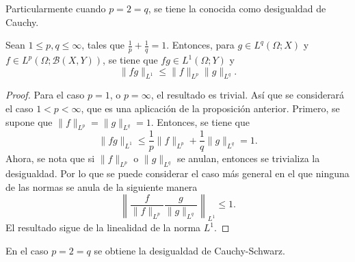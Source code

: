 Particularmente cuando $p=2=q$, se tiene la conocida como desigualdad de
Cauchy. 
\begin{proposition}
    Sean $1\leq p, q\leq \infty$, tales que $\frac{1}{p} + \frac{1}{q} = 1$.
    Entonces, para $g\in L^q(\Omega;X)$ y $f\in L^p(\Omega;\mathcal{B}(X, Y))$, se tiene
    que $fg \in L^1(\Omega;Y)$ y 
    \begin{equation*}
        \|fg\|_{L^1} \leq \|f\|_{L^p}\|g\|_
        {L^q}.
    \end{equation*}
\end{proposition}
\begin{proof}
    Para el caso $p=1$, o $p=\infty$, el resultado es trivial. Así que 
    se considerará el caso $1<p<\infty$, que es una aplicación 
    de la proposición anterior. Primero, se supone
    que $\|f\|_{L^p} = \|g\|_{L^q} = 1$. Entonces, 
    se tiene que
    \begin{equation*}
        \|fg\|_{L^1} \leq \frac{1}{p}\|f\|_{L^p} + \frac{1}{q}\|g\|_{L^q} 
        = 1.
    \end{equation*}
    Ahora, se nota que si $\|f\|_{L^p}$ o $\|g\|_{L^q}$ se anulan, 
    entonces se trivializa la desigualdad. 
    Por lo que se puede considerar el caso más general en el que ninguna de las
    normas se anula de la siguiente manera
    \begin{equation*}
        \left\| \frac{f}{\|f\|_{L^p}} \frac{g}{\|g\|_{L^q}}
        \right\|_{L^1} \leq 1.
    \end{equation*}
    El resultado sigue de la linealidad de la norma $L^1$.
\end{proof}
En el caso $p=2=q$ se obtiene la desigualdad de Cauchy-Schwarz.

